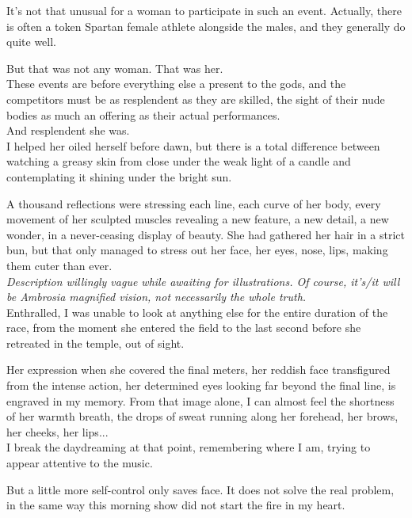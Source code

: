 \documentclass{report}
\newcommand{\dcomment}[1]{
	\emph{#1}
	\\
}
\begin{document}
It's not that unusual for a woman to participate in such an event. Actually, there is often a token Spartan female athlete alongside the males, and they generally do quite well.

But that was not any woman. That was her.\\

These events are before everything else a present to the gods, and the competitors must be as resplendent as they are skilled, the sight of their nude bodies as much an offering as their actual performances.\\

And resplendent she was.\\

I helped her oiled herself before dawn, but there is a total difference between watching a greasy skin from close under the weak light of a candle and contemplating it shining under the bright sun.

A thousand reflections were stressing each line, each curve of her body, every movement of her sculpted muscles revealing a new feature, a new detail, a new wonder, in a never-ceasing display of beauty.
She had gathered her hair in a strict bun, but that only managed to stress out her face, her eyes, nose, lips, making them cuter than ever.\\

\dcomment{
	Description willingly vague while awaiting for illustrations.
	Of course, it's/it will be Ambrosia magnified vision, not necessarily the whole truth.
}

Enthralled, I was unable to look at anything else for the entire duration of the race, from the moment she entered the field to the last second before she retreated in the temple, out of sight.

Her expression when she covered the final meters, her reddish face transfigured from the intense action, her determined eyes looking far beyond the final line, is engraved in my memory. From that image alone, I can almost feel the shortness of her warmth breath, the drops of sweat running along her forehead, her brows, her cheeks, her lips...\\

I break the daydreaming at that point, remembering where I am, trying to appear attentive to the music.

But a little more self-control only saves face. It does not solve the real problem, in the same way this morning show did not start the fire in my heart.
\end{document}

